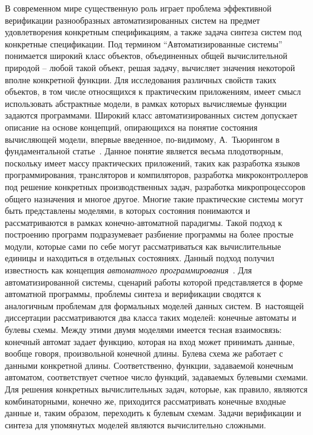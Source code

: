 \actuality
%
В современном мире существенную роль играет проблема эффективной верификации разнообразных автоматизированных систем на предмет удовлетворения конкретным спецификациям, а также задача синтеза систем под конкретные спецификации.
Под термином \enquote{Автоматизированные системы} понимается широкий класс объектов, объединенных общей вычислительной природой \--- любой такой объект, решая задачу, вычисляет значения некоторой вполне конкретной функции.
Для исследования различных свойств таких объектов, в том числе относящихся к практическим приложениям, имеет смысл использовать абстрактные модели, в рамках которых вычисляемые функции задаются программами.
Широкий класс автоматизированных систем допускает описание на основе концепций, опирающихся на понятие состояния вычисляющей модели, впервые введенное, по-видимому, А.~Тьюрингом в фундаментальной статье~\autocite{turing1937}.
Данное понятие является весьма плодотворным, поскольку имеет массу практических приложений, таких как разработка языков программирования, трансляторов и компиляторов, разработка микроконтроллеров под решение конкретных производственных задач, разработка микропроцессоров общего назначения и многое другое.
Многие такие практические системы могут быть представлены моделями, в которых состояния понимаются и рассматриваются в рамках конечно-автоматной парадигмы.
Такой подход к построению программ подразумевает разбиение программы на более простые модули, которые сами по себе могут рассматриваться как вычислительные единицы и находиться в отдельных состояниях.
Данный подход получил известность как концепция \textit{автоматного программирования}~\autocite{polikarpova2009}.
Для автоматизированной системы, сценарий работы которой представляется в форме автоматной программы, проблемы синтеза и верификации сводятся к аналогичным проблемам для формальных моделей данных систем.
В~настоящей диссертации рассматриваются два класса таких моделей: конечные автоматы и булевы схемы.
Между этими двумя моделями имеется тесная взаимосвязь: конечный автомат задает функцию, которая на вход может принимать данные, вообще говоря, произвольной конечной длины.
Булева схема же работает с данными конкретной длины.
Соответственно, функции, задаваемой конечным автоматом, соответствует счетное число функций, задаваемых булевыми схемами. Для решения конкретных вычислительных задач, которые, как правило, являются комбинаторными, конечно же, приходится рассматривать конечные входные данные и, таким образом, переходить к булевым схемам.
Задачи верификации и синтеза для упомянутых моделей являются вычислительно сложными.
